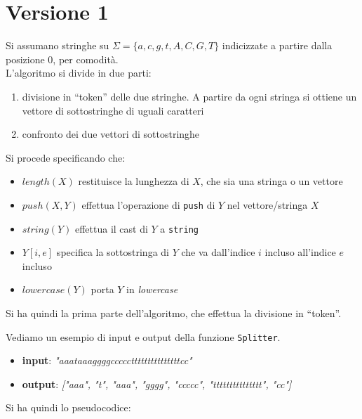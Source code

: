 \documentclass[a4paper,12pt, oneside]{book}
\begin{document}
\section{Versione 1}
Si assumano stringhe su $\Sigma=\{a,c,g,t,A,C,G,T\}$ indicizzate a partire dalla
posizione 0, per comodità.\\
L'algoritmo si divide in due parti:
\begin{enumerate}
  \item divisione in ``token'' delle due stringhe. A partire da ogni stringa si
  ottiene un vettore di sottostringhe di uguali caratteri
  \item confronto dei due vettori di sottostringhe
\end{enumerate}
Si procede specificando che:
\begin{itemize}
  \item $length(X)$ restituisce la lunghezza di $X$, che sia una stringa o un
  vettore 
  \item $push(X,Y)$ effettua l'operazione di \texttt{push} di $Y$ nel
  vettore/stringa $X$
  \item $string(Y)$ effettua il cast di $Y$ a \texttt{string}
  \item $Y[i,e]$ specifica la sottostringa di $Y$ che va dall'indice $i$ incluso
  all'indice $e$ incluso
  \item $lowercase(Y)$ porta $Y$ in \textit{lowercase}
\end{itemize}
Si ha quindi la prima parte dell'algoritmo, che effettua la divisione in
``token''.
\newpage
\begin{esempio}
  Vediamo un esempio di input e output della funzione \texttt{Splitter}.
  \begin{itemize}
    \item \textbf{input}: \textit{"aaataaaggggccccctttttttttttttttcc"}
    \item \textbf{output}: \textit{["aaa", "t", "aaa", "gggg", "ccccc",
      "ttttttttttttttt", "cc"]} 
  \end{itemize}
\end{esempio}
Si ha quindi lo pseudocodice:
\end{document}
